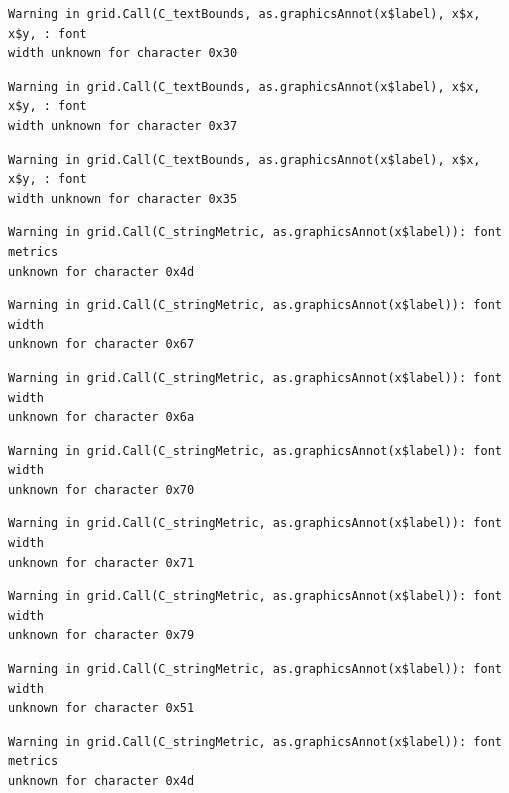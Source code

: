 \documentclass[
  letterpaper,
  DIV=11,
  numbers=noendperiod]{scrreprt}
\begin{document}
\begin{verbatim}
Warning in grid.Call(C_textBounds, as.graphicsAnnot(x$label), x$x, x$y, : font
width unknown for character 0x30
\end{verbatim}

\begin{verbatim}
Warning in grid.Call(C_textBounds, as.graphicsAnnot(x$label), x$x, x$y, : font
width unknown for character 0x37
\end{verbatim}

\begin{verbatim}
Warning in grid.Call(C_textBounds, as.graphicsAnnot(x$label), x$x, x$y, : font
width unknown for character 0x35
\end{verbatim}

\begin{verbatim}
Warning in grid.Call(C_stringMetric, as.graphicsAnnot(x$label)): font metrics
unknown for character 0x4d
\end{verbatim}

\begin{verbatim}
Warning in grid.Call(C_stringMetric, as.graphicsAnnot(x$label)): font width
unknown for character 0x67
\end{verbatim}

\begin{verbatim}
Warning in grid.Call(C_stringMetric, as.graphicsAnnot(x$label)): font width
unknown for character 0x6a
\end{verbatim}

\begin{verbatim}
Warning in grid.Call(C_stringMetric, as.graphicsAnnot(x$label)): font width
unknown for character 0x70
\end{verbatim}

\begin{verbatim}
Warning in grid.Call(C_stringMetric, as.graphicsAnnot(x$label)): font width
unknown for character 0x71
\end{verbatim}

\begin{verbatim}
Warning in grid.Call(C_stringMetric, as.graphicsAnnot(x$label)): font width
unknown for character 0x79
\end{verbatim}

\begin{verbatim}
Warning in grid.Call(C_stringMetric, as.graphicsAnnot(x$label)): font width
unknown for character 0x51
\end{verbatim}

\begin{verbatim}
Warning in grid.Call(C_stringMetric, as.graphicsAnnot(x$label)): font metrics
unknown for character 0x4d
\end{verbatim}
\end{document}
